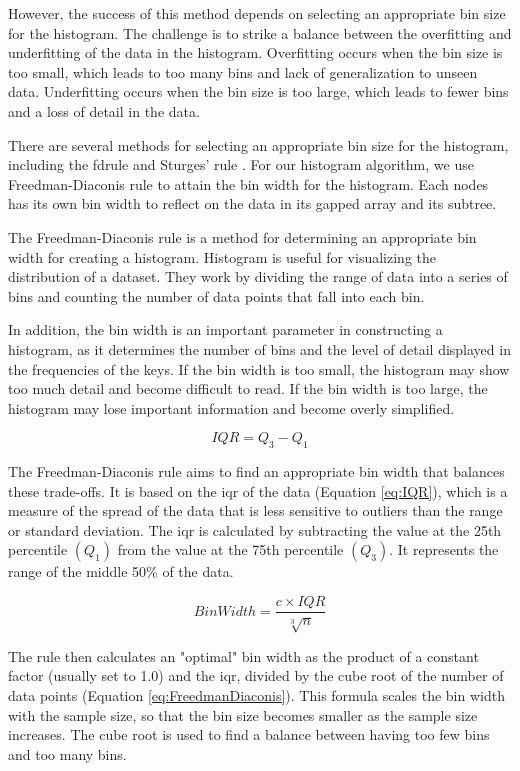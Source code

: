 However, the success of this method depends on selecting an appropriate bin size for the histogram. The challenge is to strike a balance between the overfitting and underfitting of the data in the histogram. Overfitting occurs when the bin size is too small, which leads to too many bins and lack of generalization to unseen data. Underfitting occurs when the bin size is too large, which leads to fewer bins and a loss of detail in the data.

There are several methods for selecting an appropriate bin size for the histogram, including the \acrfull{fdrule} and Sturges' rule \cite{sahann2021histogram}. For our histogram algorithm, we use Freedman-Diaconis rule to attain the bin width for the histogram.
Each nodes has its own bin width to reflect on the data in its gapped array and its subtree. 

The Freedman-Diaconis rule is a method for determining an appropriate bin width for creating a histogram. Histogram is useful for visualizing the distribution of a dataset. They work by dividing the range of data into a series of bins and counting the number of data points that fall into each bin. 

In addition, the bin width is an important parameter in constructing a histogram, as it determines the number of bins and the level of detail displayed in the frequencies of the keys. If the bin width is too small, the histogram may show too much detail and become difficult to read. If the bin width is too large, the histogram may lose important information and become overly simplified.

\begin{equation}\label{eq:IQR}
    IQR = Q_3 - Q_1
\end{equation}


The Freedman-Diaconis rule aims to find an appropriate bin width that balances these trade-offs. It is based on the \acrfull{iqr} of the data (Equation \ref{eq:IQR}), which is a measure of the spread of the data that is less sensitive to outliers than the range or standard deviation. The \acrshort{iqr} is calculated by subtracting the value at the 25th percentile $(Q_1)$ from the value at the 75th percentile $(Q_3)$. It represents the range of the middle 50\% of the data.

\begin{equation}\label{eq:FreedmanDiaconis}
    Bin Width = \frac{c\times IQR}{\sqrt[3]{n}}
\end{equation}

The rule then calculates an "optimal" bin width as the product of a constant factor (usually set to 1.0) and the \acrshort{iqr}, divided by the cube root of the number of data points (Equation \ref{eq:FreedmanDiaconis}). This formula scales the bin width with the sample size, so that the bin size becomes smaller as the sample size increases. The cube root is used to find a balance between having too few bins and too many bins.

